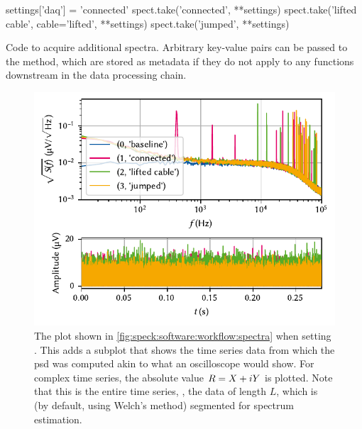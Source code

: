 \begin{listing}[htpb]
    \begin{pycode}
        settings['daq'] = 'connected'
        spect.take('connected', **settings)
        spect.take('lifted cable', cable='lifted', **settings)
        spect.take('jumped', **settings)
    \end{pycode}
    \caption[]{
        Code to acquire additional spectra.
        Arbitrary key-value pairs can be passed to the  method, which are stored as metadata if they do not apply to any functions downstream in the data processing chain.
    }
    \label{lst:speck:workflow:spectra}
\end{listing}
\begin{figure}
    \centering
    \includegraphics{img/pdf/spectrometer/workflow_timetrace}
    \caption[]{
        The \pyspeck plot shown in \cref{fig:speck:software:workflow:spectra} when setting .
        This adds a subplot that shows the time series data from which the \gls{psd} was computed akin to what an oscilloscope would show.
        For complex time series, the absolute value $R = X + i Y$ is plotted.
        Note that this is the entire time series, \ie, the data of length $L$, which is (by default, using Welch's method) segmented for spectrum estimation.
    }
    \label{fig:speck:software:workflow:timetrace}
\end{figure}

